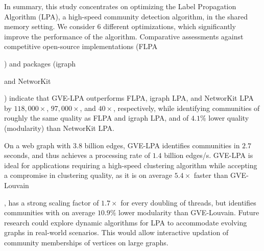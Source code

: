 
In summary, this study concentrates on optimizing the Label Propagation Algorithm (LPA), a high-speed community detection algorithm, in the shared memory setting. We consider 6 different optimizations, which significantly improve the performance of the algorithm. Comparative assessments against competitive open-source implementations (FLPA) and packages (igraph and NetworKit) indicate that GVE-LPA outperforms FLPA, igraph LPA, and NetworKit LPA by $118,000\times$, $97,000\times$, and $40\times$, respectively, while identifying communities of roughly the same quality as FLPA and igraph LPA, and of $4.1\%$ lower quality (modularity) than NetworKit LPA.

On a web graph with $3.8$ billion edges, GVE-LPA identifies communities in $2.7$ seconds, and thus achieves a processing rate of $1.4$ billion edges/s. GVE-LPA is ideal for applications requiring a high-speed clustering algorithm while accepting a compromise in clustering quality, as it is on average $5.4\times$ faster than GVE-Louvain, has a strong scaling factor of $1.7\times$ for every doubling of threads, but identifies communities with on average $10.9\%$ lower modularity than GVE-Louvain. Future research could explore dynamic algorithms for LPA to accommodate evolving graphs in real-world scenarios. This would allow interactive updation of community memberships of vertices on large graphs.
